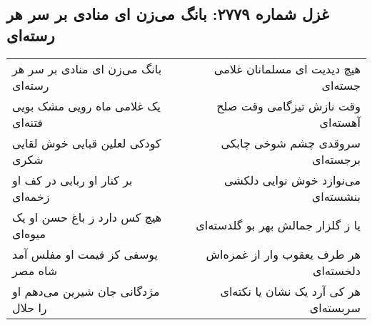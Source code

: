\begin{center}
\section*{غزل شماره ۲۷۷۹: بانگ می‌زن ای منادی بر سر هر رسته‌ای}
\label{sec:2779}
\begin{longtable}{l p{0.5cm} r}
بانگ می‌زن ای منادی بر سر هر رسته‌ای
&&
هیچ دیدیت ای مسلمانان غلامی جسته‌ای
\\
یک غلامی ماه رویی مشک بویی فتنه‌ای
&&
وقت نازش تیزگامی وقت صلح آهسته‌ای
\\
کودکی لعلین قبایی خوش لقایی شکری
&&
سروقدی چشم شوخی چابکی برجسته‌ای
\\
بر کنار او ربابی در کف او زخمه‌ای
&&
می‌نوازد خوش نوایی دلکشی بنشسته‌ای
\\
هیچ کس دارد ز باغ حسن او یک میوه‌ای
&&
یا ز گلزار جمالش بهر بو گلدسته‌ای
\\
یوسفی کز قیمت او مفلس آمد شاه مصر
&&
هر طرف یعقوب وار از غمزه‌اش دلخسته‌ای
\\
مژدگانی جان شیرین می‌دهم او را حلال
&&
هر کی آرد یک نشان یا نکته‌ای سربسته‌ای
\\
\end{longtable}
\end{center}
